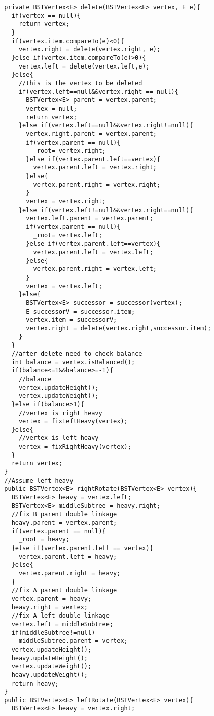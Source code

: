 \documentclass[11pt]{article}
\theoremstyle{definition}
\begin{document}
\begin{verbatim}
  private BSTVertex<E> delete(BSTVertex<E> vertex, E e){
    if(vertex == null){
      return vertex;
    }
    if(vertex.item.compareTo(e)<0){
      vertex.right = delete(vertex.right, e);
    }else if(vertex.item.compareTo(e)>0){
      vertex.left = delete(vertex.left,e);
    }else{
      //this is the vertex to be deleted
      if(vertex.left==null&&vertex.right == null){
        BSTVertex<E> parent = vertex.parent;
        vertex = null;
        return vertex;
      }else if(vertex.left==null&&vertex.right!=null){
        vertex.right.parent = vertex.parent;
        if(vertex.parent == null){
          _root= vertex.right;
        }else if(vertex.parent.left==vertex){
          vertex.parent.left = vertex.right;
        }else{
          vertex.parent.right = vertex.right;
        }
        vertex = vertex.right;
      }else if(vertex.left!=null&&vertex.right==null){
        vertex.left.parent = vertex.parent;
        if(vertex.parent == null){
          _root= vertex.left;
        }else if(vertex.parent.left==vertex){
          vertex.parent.left = vertex.left;
        }else{
          vertex.parent.right = vertex.left;
        }
        vertex = vertex.left;
      }else{
        BSTVertex<E> successor = successor(vertex);
        E successorV = successor.item;
        vertex.item = successorV;
        vertex.right = delete(vertex.right,successor.item);
      }
    }
    //after delete need to check balance
    int balance = vertex.isBalanced();
    if(balance<=1&&balance>=-1){
      //balance
      vertex.updateHeight();
      vertex.updateWeight();
    }else if(balance>1){
      //vertex is right heavy
      vertex = fixLeftHeavy(vertex);
    }else{
      //vertex is left heavy
      vertex = fixRightHeavy(vertex);
    }
    return vertex;
  }
  //Assume left heavy
  public BSTVertex<E> rightRotate(BSTVertex<E> vertex){
    BSTVertex<E> heavy = vertex.left;
    BSTVertex<E> middleSubtree = heavy.right;
    //fix B parent double linkage
    heavy.parent = vertex.parent;
    if(vertex.parent == null){
      _root = heavy;
    }else if(vertex.parent.left == vertex){
      vertex.parent.left = heavy;
    }else{
      vertex.parent.right = heavy;
    }
    //fix A parent double linkage
    vertex.parent = heavy;
    heavy.right = vertex;
    //fix A left double linkage
    vertex.left = middleSubtree;
    if(middleSubtree!=null)
      middleSubtree.parent = vertex;
    vertex.updateHeight();
    heavy.updateHeight();
    vertex.updateWeight();
    heavy.updateWeight();
    return heavy;
  }
  public BSTVertex<E> leftRotate(BSTVertex<E> vertex){
    BSTVertex<E> heavy = vertex.right;

\end{verbatim}
\end{document}
